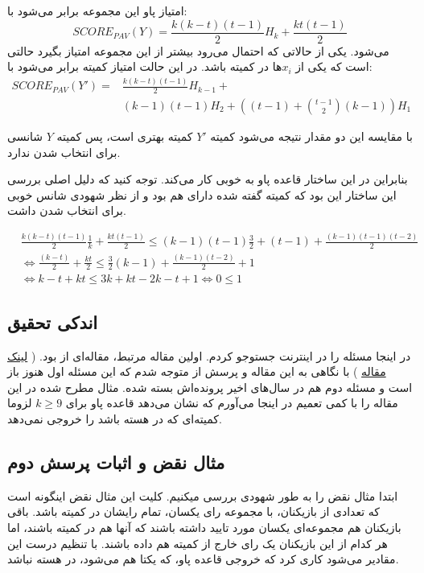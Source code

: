 \documentclass[12pt]{article}
\begin{document}
امتیاز پاو این مجموعه برابر می‌شود با:
\[
SCORE_{PAV}(Y) = \frac{k(k-t)(t-1)}{2} H_k + \frac{kt(t-1)}{2}
\]
می‌شود. یکی از حالاتی که احتمال می‌رود بیشتر از این مجموعه 
امتیاز بگیرد حالتی است که یکی از $x_i$ها
در کمیته باشد. در این حالت امتیاز کمیته برابر می‌شود با:
\begin{align*}
    SCORE_{PAV}(Y') =& \frac{k(k-t)(t-1)}{2} H_{k-1} + \\
    &(k-1)(t-1) H_2 + \left((t-1) + \binom{t-1}{2}(k-1)\right) H_1
\end{align*}

با مقایسه این دو مقدار نتیجه می‌شود کمیته $Y'$ 
کمیته بهتری است، پس کمیته $Y$
شانسی برای انتخاب شدن ندارد.

بنابراین در این ساختار
قاعده پاو به خوبی کار می‌کند.
توجه کنید که دلیل اصلی بررسی این ساختار این بود که کمیته گفته شده 
دارای 
هم بود و از نظر شهودی شانس خوبی برای انتخاب شدن داشت.

\begin{align*}
        &\frac{k(k-t)(t-1)}{2} \frac{1}{k} + \frac{kt(t-1)}{2} \le
        (k-1)(t-1) \frac{3}{2} + (t-1) + \frac{(k-1)(t-1)(t-2)}{2} \\
        & \Leftrightarrow \frac{(k-t)}{2} + \frac{kt}{2} \le \frac{3}{2} (k-1) + \frac{(k-1)(t-2)}{2} + 1 \\ 
        & \Leftrightarrow k - t + kt \le 3k + kt - 2k - t + 1 \Leftrightarrow 0 \le 1
\end{align*}

\subsection{اندکی تحقیق}
در اینجا مسئله را در اینترنت جستوجو کردم.
اولین مقاله مرتبط، مقاله‌ای از
بود. 
(
    \href{https://scholar.google.com/citations?view_op=view_citation&hl=en&user=V-6Brb8AAAAJ&sortby=pubdate&citation_for_view=V-6Brb8AAAAJ:GFxP56DSvIMC}{لینک مقاله}
)
با نگاهی به این مقاله و پرسش از 
متوجه شدم که این مسئله اول هنوز باز است
و مسئله دوم هم در سال‌های اخیر پرونده‌اش بسته شده. مثال مطرح شده در 
این مقاله را با کمی تعمیم در
اینجا می‌آورم که نشان می‌دهد قاعده پاو برای
$k\ge 9$
لزوما کمیته‌ای که در هسته باشد 
را خروجی نمی‌دهد.

\subsection{مثال نقض و اثبات پرسش دوم}
\label{cex}
ابتدا مثال نقض را به طور شهودی بررسی میکنیم. کلیت این مثال نقض اینگونه است
که تعدادی از بازیکنان، با مجموعه رای یکسان، تمام رایشان در کمیته باشد. باقی بازیکنان
هم مجموعه‌ای یکسان مورد تایید داشته باشند که آنها هم در کمیته باشند، اما هر کدام از
این بازیکنان یک رای خارج از کمیته هم داده باشند. با تنظیم درست این مقادیر
می‌شود کاری کرد که خروجی قاعده پاو، که یکتا هم می‌شود، در هسته نباشد.
\end{document}
